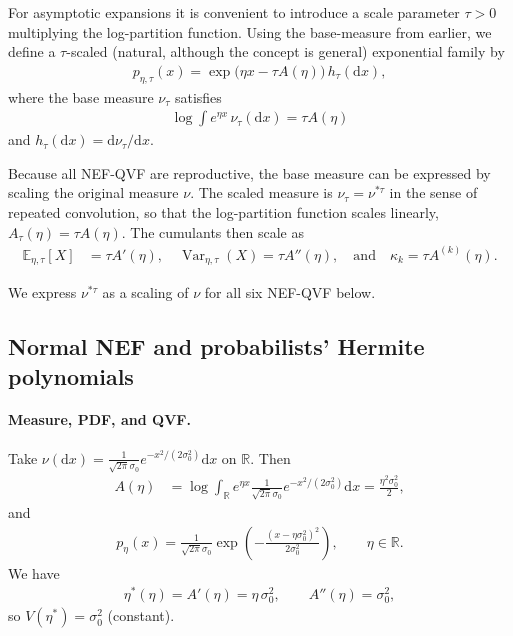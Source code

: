\documentclass[a4paper,11pt]{article}
\numberwithin{equation}{section}
\theoremstyle{plain}
\theoremstyle{definition}
\theoremstyle{remark}
\newcommand{\R}{\ensuremath{\mathbb{R}}\xspace}
\newcommand{\1}{\ensuremath{\mathds{1}}\xspace}
\newcommand{\dd}{\ensuremath{{\textrm{d}}}\xspace}
\newcommand{\E}{{\ensuremath{{\mathbb{E}}}}\xspace}
\DeclareMathOperator{\Var}{Var}
\begin{document}
For asymptotic expansions it is convenient to introduce a scale parameter
$\tau>0$ multiplying the log-partition function. 
Using the base-measure from earlier, we define a
$\tau$-scaled (natural, although the concept is general) exponential family by
\begin{align}
p_{\eta,\tau}(x)
=
\exp\!\big(\eta x-\tau A(\eta)\big)\,
h_\tau(\dd x),
\label{eq:beta-nef}
\end{align}
where the base measure $\nu_\tau$ satisfies
\begin{align}
\log\int e^{\eta x}\,\nu_\tau(\dd x)
=
\tau A(\eta)
\label{eq:beta-base-measure}
\end{align}
and $h_\tau(\dd x)=\dd\nu_\tau/\dd x$.

Because all NEF-QVF are reproductive, the base measure can be expressed by scaling the original measure $\nu$. The scaled measure is $\nu_\tau = \nu^{*\tau}$
in the sense of repeated convolution, so that
the log-partition function scales linearly, $A_\tau(\eta)=\tau A(\eta)$.
The cumulants then scale as
\begin{align}
\E_{\eta,\tau}[X] &= \tau A'(\eta),\quad\Var_{\eta,\tau}(X) = \tau A''(\eta),\quad\text{and}\quad\kappa_k = \tau A^{(k)}(\eta).
\end{align}

We express $\nu^{*\tau}$ as a scaling of $\nu$ for all six  NEF-QVF below.

\subsection{Normal NEF and probabilists' Hermite polynomials}\label{sec:NEF-QVF-Normal}
\paragraph{Measure, PDF, and QVF.} 
Take $\nu(\dd x)=\frac{1}{\sqrt{2\pi}\sigma_0}e^{-x^2/(2\sigma_0^2)}\dd x$ on $\R$. Then
\begin{align}
A(\eta)
&=\log\int_\R e^{\eta x}\frac{1}{\sqrt{2\pi}\sigma_0}e^{-x^2/(2\sigma_0^2)}\dd x
=\frac{\eta^2\sigma_0^2}{2},
\end{align}
and
\begin{align}
p_\eta(x)
=\frac{1}{\sqrt{2\pi}\sigma_0}\exp\left(-\frac{(x-\eta\sigma_0^2)^2}{2\sigma_0^2}\right),
\qquad \eta\in\R.
\end{align}
We have
\begin{align}
\eta^\ast(\eta)=A'(\eta)=\eta\,\sigma_0^2,
\qquad 
A''(\eta)=\sigma_0^2,
\end{align}
so $V(\eta^\ast)=\sigma_0^2$ (constant). 
\end{document}
